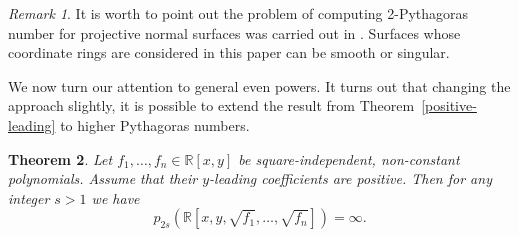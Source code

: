 \documentclass[12pt,reqno]{amsart}   	%
\newtheorem{thm}{Theorem}[section]
\theoremstyle{remark}
\newtheorem{remark}[thm]{Remark}
\newcommand{\R}{\mathbb{R}}
\newcommand{\brac}[1]{\left ( #1 \right )}
\begin{document}
\begin{remark}
    It is worth to point out the problem of computing 2-Pythagoras number for projective normal surfaces was carried out in \cite{osz2025}. Surfaces whose coordinate rings are considered in this paper can be smooth or singular. 
\end{remark}





\vspace{0.3cm}
We now turn our attention to general even powers. It turns out that changing the approach slightly, it is possible to extend the result from Theorem~\ref{positive-leading} to higher Pythagoras numbers. 

\begin{thm}
    Let $f_1,\dots, f_n\in \R[x,y]$ be square-independent, non-constant polynomials. Assume that their $y$-leading coefficients are positive. Then for any integer $s>1$ we have
    \[
    p_{2s}\brac{\R[x,y,\sqrt{f_1},\dots, \sqrt{f_n}]} = \infty.
    \]
\end{thm}
\end{document}
